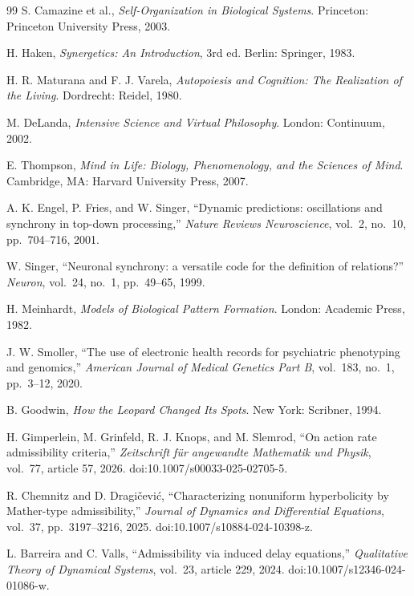 \documentclass[11pt,a4paper]{article}
\theoremstyle{plain}
\theoremstyle{definition}
\begin{document}
\begin{thebibliography}{99}
S. Camazine et al.,
\textit{Self-Organization in Biological Systems}.
Princeton: Princeton University Press, 2003.

H. Haken,
\textit{Synergetics: An Introduction},
3rd ed.
Berlin: Springer, 1983.

H. R. Maturana and F. J. Varela,
\textit{Autopoiesis and Cognition: The Realization of the Living}.
Dordrecht: Reidel, 1980.

M. DeLanda,
\textit{Intensive Science and Virtual Philosophy}.
London: Continuum, 2002.

E. Thompson,
\textit{Mind in Life: Biology, Phenomenology, and the Sciences of Mind}.
Cambridge, MA: Harvard University Press, 2007.

A. K. Engel, P. Fries, and W. Singer,
``Dynamic predictions: oscillations and synchrony in top-down processing,''
\textit{Nature Reviews Neuroscience},
vol.\ 2, no.\ 10, pp.\ 704--716, 2001.

W. Singer,
``Neuronal synchrony: a versatile code for the definition of relations?''
\textit{Neuron},
vol.\ 24, no.\ 1, pp.\ 49--65, 1999.

H. Meinhardt,
\textit{Models of Biological Pattern Formation}.
London: Academic Press, 1982.

J. W. Smoller,
``The use of electronic health records for psychiatric phenotyping and genomics,''
\textit{American Journal of Medical Genetics Part B},
vol.\ 183, no.\ 1, pp.\ 3--12, 2020.

B. Goodwin,
\textit{How the Leopard Changed Its Spots}.
New York: Scribner, 1994.

H. Gimperlein, M. Grinfeld, R. J. Knops, and M. Slemrod,
``On action rate admissibility criteria,''
\textit{Zeitschrift f\"ur angewandte Mathematik und Physik},
vol.\ 77, article 57, 2026.
doi:10.1007/s00033-025-02705-5.

R. Chemnitz and D. Dragi\v{c}evi\'c,
``Characterizing nonuniform hyperbolicity by Mather-type admissibility,''
\textit{Journal of Dynamics and Differential Equations},
vol.\ 37, pp.\ 3197--3216, 2025.
doi:10.1007/s10884-024-10398-z.

L. Barreira and C. Valls,
``Admissibility via induced delay equations,''
\textit{Qualitative Theory of Dynamical Systems},
vol.\ 23, article 229, 2024.
doi:10.1007/s12346-024-01086-w.


\end{thebibliography}
\end{document}
